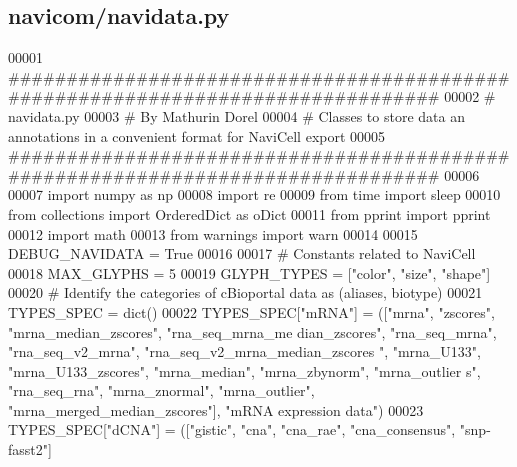 \hypertarget{navidata_8py_source}{
\subsection{navicom/navidata.py}
}

\begin{DoxyCode}
00001 \textcolor{comment}{################################################################################}
00002 \textcolor{comment}{# navidata.py}
00003 \textcolor{comment}{# By Mathurin Dorel}
00004 \textcolor{comment}{# Classes to store data an annotations in a convenient format for NaviCell export
      }
00005 \textcolor{comment}{################################################################################}
00006 
00007 \textcolor{keyword}{import} numpy \textcolor{keyword}{as} np
00008 \textcolor{keyword}{import} re
00009 \textcolor{keyword}{from} time \textcolor{keyword}{import} sleep
00010 \textcolor{keyword}{from} collections \textcolor{keyword}{import} OrderedDict \textcolor{keyword}{as} oDict
00011 \textcolor{keyword}{from} pprint \textcolor{keyword}{import} pprint
00012 \textcolor{keyword}{import} math
00013 \textcolor{keyword}{from} warnings \textcolor{keyword}{import} warn
00014 
00015 DEBUG\_NAVIDATA = \textcolor{keyword}{True}
00016 
00017 \textcolor{comment}{# Constants related to NaviCell}
00018 MAX\_GLYPHS = 5
00019 GLYPH\_TYPES = [\textcolor{stringliteral}{"color"}, \textcolor{stringliteral}{"size"}, \textcolor{stringliteral}{"shape"}]
00020 \textcolor{comment}{# Identify the categories of cBioportal data as (aliases, biotype)}
00021 TYPES\_SPEC = dict()
00022 TYPES\_SPEC[\textcolor{stringliteral}{"mRNA"}] = ([\textcolor{stringliteral}{"mrna"}, \textcolor{stringliteral}{"zscores"}, \textcolor{stringliteral}{"mrna\_median\_zscores"}, \textcolor{stringliteral}{"rna\_seq\_mrna\_me
      dian\_zscores"}, \textcolor{stringliteral}{"rna\_seq\_mrna"}, \textcolor{stringliteral}{"rna\_seq\_v2\_mrna"}, \textcolor{stringliteral}{"rna\_seq\_v2\_mrna\_median\_zscores
      "}, \textcolor{stringliteral}{"mrna\_U133"}, \textcolor{stringliteral}{"mrna\_U133\_zscores"}, \textcolor{stringliteral}{"mrna\_median"}, \textcolor{stringliteral}{"mrna\_zbynorm"}, \textcolor{stringliteral}{"mrna\_outlier
      s"}, \textcolor{stringliteral}{"rna\_seq\_rna"}, \textcolor{stringliteral}{"mrna\_znormal"}, \textcolor{stringliteral}{"mrna\_outlier"}, \textcolor{stringliteral}{"mrna\_merged\_median\_zscores"}],
       \textcolor{stringliteral}{"mRNA expression data"})
00023 TYPES\_SPEC[\textcolor{stringliteral}{"dCNA"}] = ([\textcolor{stringliteral}{"gistic"}, \textcolor{stringliteral}{"cna"}, \textcolor{stringliteral}{"cna\_rae"}, \textcolor{stringliteral}{"cna\_consensus"}, \textcolor{stringliteral}{"snp-fasst2"}]

\end{DoxyCode}
